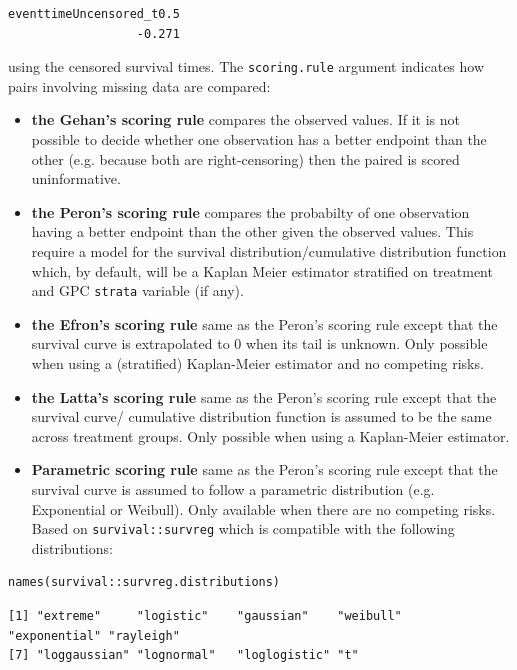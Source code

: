 \documentclass[12pt]{article}
\begin{document}
\begin{verbatim}
eventtimeUncensored_t0.5 
                  -0.271
\end{verbatim}


using the censored survival times. The \texttt{scoring.rule} argument
indicates how pairs involving missing data are compared:
\begin{itemize}
\item \textbf{the Gehan's scoring rule} compares the observed values. If it is
not possible to decide whether one observation has a better
endpoint than the other (e.g. because both are right-censoring)
then the paired is scored uninformative.
\item \textbf{the Peron's scoring rule} compares the probabilty of one
observation having a better endpoint than the other given the
observed values. This require a model for the survival
distribution/cumulative distribution function which, by default,
will be a Kaplan Meier estimator stratified on treatment and GPC
\texttt{strata} variable (if any).
\item \textbf{the Efron's scoring rule} same as the Peron's scoring rule
except that the survival curve is extrapolated to 0 when its
tail is unknown. Only possible when using a (stratified)
Kaplan-Meier estimator and no competing risks.
\item \textbf{the Latta's scoring rule} same as the Peron's scoring rule
except that the survival curve/ cumulative distribution function
is assumed to be the same across treatment groups. Only possible
when using a Kaplan-Meier estimator.
\item \textbf{Parametric scoring rule} same as the Peron's scoring rule
except that the survival curve is assumed to follow a parametric
distribution (e.g. Exponential or Weibull). Only available when
there are no competing risks. Based on \texttt{survival::survreg} which
is compatible with the following distributions:
\end{itemize}
\lstset{language=r,label= ,caption= ,captionpos=b,numbers=none}
\begin{lstlisting}
names(survival::survreg.distributions)
\end{lstlisting}

\begin{verbatim}
[1] "extreme"     "logistic"    "gaussian"    "weibull"     "exponential" "rayleigh"   
[7] "loggaussian" "lognormal"   "loglogistic" "t"
\end{verbatim}
\end{document}
